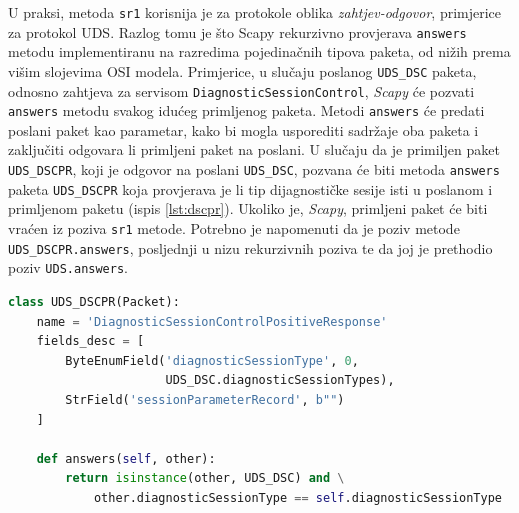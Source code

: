 \documentclass[times, utf8, diplomski, numeric]{fer}
\begin{document}
U praksi, metoda \texttt{sr1} korisnija je za protokole oblika \textit{zahtjev-odgovor}, primjerice za protokol UDS. Razlog tomu je što Scapy rekurzivno provjerava \texttt{answers} metodu implementiranu na razredima pojedinačnih tipova paketa, od nižih prema višim slojevima OSI modela. Primjerice, u slučaju poslanog \texttt{UDS\_DSC} paketa, odnosno zahtjeva za servisom \texttt{DiagnosticSessionControl}, \textit{Scapy} će pozvati \texttt{answers} metodu svakog idućeg primljenog paketa. Metodi \texttt{answers} će predati poslani paket kao parametar, kako bi mogla usporediti sadržaje oba paketa i zaključiti odgovara li primljeni paket na poslani. U slučaju da je primiljen paket \texttt{UDS\_DSCPR}, koji je odgovor na poslani \texttt{UDS\_DSC}, pozvana će biti metoda \texttt{answers} paketa \texttt{UDS\_DSCPR} koja provjerava je li tip dijagnostičke sesije isti u poslanom i primljenom paketu (ispis \ref{lst:dscpr}). Ukoliko je, \textit{Scapy}, primljeni paket će biti vraćen iz poziva \texttt{sr1} metode. Potrebno je napomenuti da je poziv metode \texttt{UDS\_DSCPR.answers}, posljednji u nizu rekurzivnih poziva te da joj je prethodio poziv \texttt{UDS.answers}. 
\bigskip
\begin{lstlisting}[language=Python, label={lst:dscpr},caption={\texttt{UDS\_DSCPR.answers}metoda}]
class UDS_DSCPR(Packet):
    name = 'DiagnosticSessionControlPositiveResponse'
    fields_desc = [
        ByteEnumField('diagnosticSessionType', 0,
                      UDS_DSC.diagnosticSessionTypes),
        StrField('sessionParameterRecord', b"")
    ]

    def answers(self, other):
        return isinstance(other, UDS_DSC) and \
            other.diagnosticSessionType == self.diagnosticSessionType
\end{lstlisting}
\end{document}
